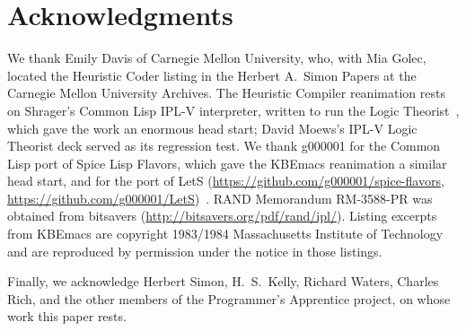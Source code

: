 \documentclass[11pt]{article}
\begin{document}
\section*{Acknowledgments}

We thank Emily Davis of Carnegie Mellon University, who, with Mia
Golec, located the Heuristic Coder listing in the Herbert A.~Simon
Papers at the Carnegie Mellon University Archives. The Heuristic Compiler reanimation
rests on Shrager's Common Lisp IPL-V interpreter, written to run the
Logic Theorist~\cite{shrager2026,shragerrepo}, which gave the work an
enormous head start; David Moews's IPL-V Logic Theorist deck served as
its regression test. We thank g000001 for the Common Lisp port of
Spice Lisp Flavors, which gave the KBEmacs reanimation a similar head
start, and for the port of LetS (\url{https://github.com/g000001/spice-flavors},
\url{https://github.com/g000001/LetS})~\cite{g000001}. RAND Memorandum RM-3588-PR was obtained from
bitsavers (\url{http://bitsavers.org/pdf/rand/ipl/}).
Listing excerpts from KBEmacs are copyright 1983/1984
Massachusetts Institute of Technology and are reproduced by permission
under the notice in those listings.

Finally, we acknowledge Herbert Simon, H.~S.~Kelly, Richard Waters,
Charles Rich, and the other members of the Programmer's
Apprentice project, on whose work this paper rests.
\end{document}
